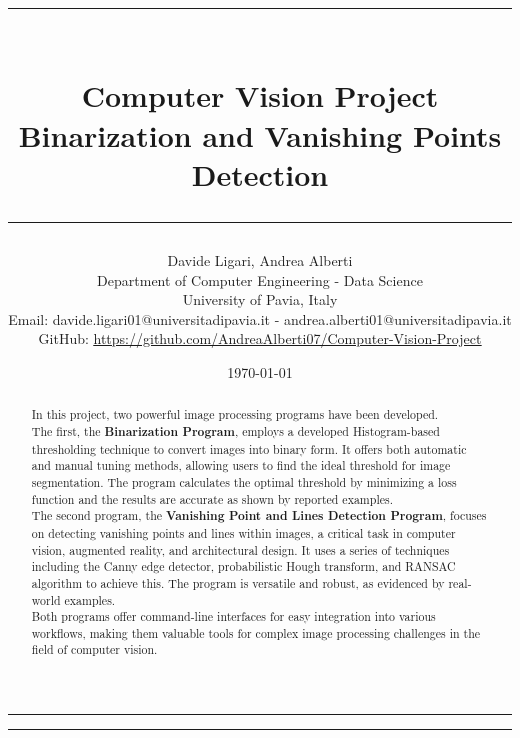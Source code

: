 \documentclass{class}
\title{
    \rule{\textwidth}{0.3pt}\vspace{0.3cm}\\
    \textbf{Computer Vision Project}\vspace{0.2cm}\\
    \large{Binarization and Vanishing Points Detection}
    \rule{\textwidth}{0.3pt}\vspace{0.5cm}}
\author{Davide Ligari, Andrea Alberti\vspace{0.2cm}\\
    \small Department of Computer Engineering - Data Science\\
    \small University of Pavia, Italy \\
    \small Email: davide.ligari01@universitadipavia.it - andrea.alberti01@universitadipavia.it \\
    \small GitHub: \href{https://github.com/AndreaAlberti07/Computer-Vision-Project}{\underline{https://github.com/AndreaAlberti07/Computer-Vision-Project}}
    \vspace{0.5cm}}
\date{\today}
\begin{document}
\begin{titlepage}

    \maketitle
    \thispagestyle{empty}

    \begin{multicols*}{2}

        \hrule
        \begin{abstract}
            \noindent
            In this project, two powerful image processing programs have been developed.\\
            The first, the \textbf{Binarization Program}, employs a developed Histogram-based thresholding technique to
            convert images into binary form. It offers both automatic and manual tuning methods, allowing users to find
            the ideal threshold for image segmentation. The program calculates the optimal threshold by minimizing a loss
            function and the results are accurate as shown by reported examples.\\
            The second program, the \textbf{Vanishing Point and Lines Detection Program}, focuses on detecting vanishing
            points and lines within images, a critical task in computer vision, augmented reality, and architectural design.
            It uses a series of techniques including the Canny edge detector, probabilistic Hough transform, and RANSAC
            algorithm to achieve this. The program is versatile and robust, as evidenced by real-world examples.\\
            Both programs offer command-line interfaces for easy integration into various workflows,
            making them valuable tools for complex image processing challenges in the field of computer vision.
            \\
        \end{abstract}
        \newcolumn
        \hrule
        \tableofcontents
    \end{multicols*}
\end{titlepage}

\clearpage
\pagestyle{FirstPage}

\clearpage

\end{document}
